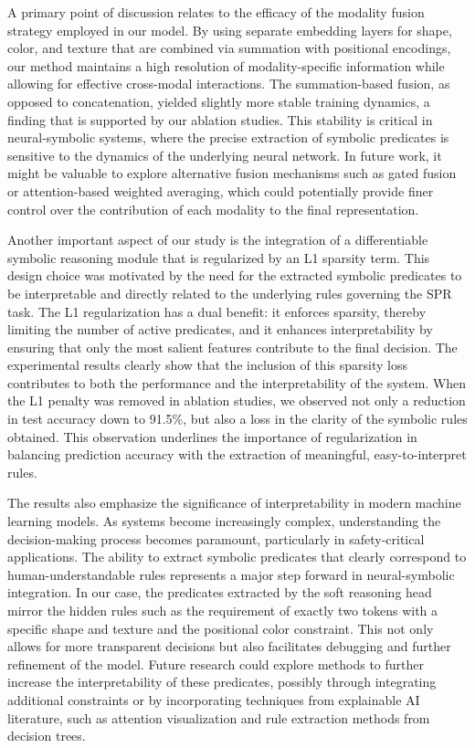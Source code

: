 \documentclass{article}
\begin{document}
A primary point of discussion relates to the efficacy of the modality fusion strategy employed in our model. By using separate embedding layers for shape, color, and texture that are combined via summation with positional encodings, our method maintains a high resolution of modality-specific information while allowing for effective cross-modal interactions. The summation-based fusion, as opposed to concatenation, yielded slightly more stable training dynamics, a finding that is supported by our ablation studies. This stability is critical in neural-symbolic systems, where the precise extraction of symbolic predicates is sensitive to the dynamics of the underlying neural network. In future work, it might be valuable to explore alternative fusion mechanisms such as gated fusion or attention-based weighted averaging, which could potentially provide finer control over the contribution of each modality to the final representation.

Another important aspect of our study is the integration of a differentiable symbolic reasoning module that is regularized by an L1 sparsity term. This design choice was motivated by the need for the extracted symbolic predicates to be interpretable and directly related to the underlying rules governing the SPR task. The L1 regularization has a dual benefit: it enforces sparsity, thereby limiting the number of active predicates, and it enhances interpretability by ensuring that only the most salient features contribute to the final decision. The experimental results clearly show that the inclusion of this sparsity loss contributes to both the performance and the interpretability of the system. When the L1 penalty was removed in ablation studies, we observed not only a reduction in test accuracy down to 91.5\%, but also a loss in the clarity of the symbolic rules obtained. This observation underlines the importance of regularization in balancing prediction accuracy with the extraction of meaningful, easy-to-interpret rules.

The results also emphasize the significance of interpretability in modern machine learning models. As systems become increasingly complex, understanding the decision-making process becomes paramount, particularly in safety-critical applications. The ability to extract symbolic predicates that clearly correspond to human-understandable rules represents a major step forward in neural-symbolic integration. In our case, the predicates extracted by the soft reasoning head mirror the hidden rules such as the requirement of exactly two tokens with a specific shape and texture and the positional color constraint. This not only allows for more transparent decisions but also facilitates debugging and further refinement of the model. Future research could explore methods to further increase the interpretability of these predicates, possibly through integrating additional constraints or by incorporating techniques from explainable AI literature, such as attention visualization and rule extraction methods from decision trees.
\end{document}

